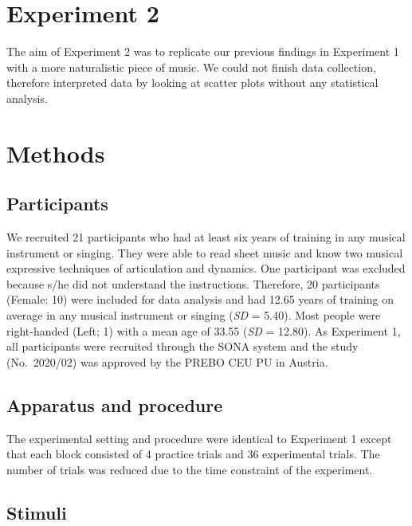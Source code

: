 \documentclass[
  man,floatsintext]{apa6}
\begin{document}
\clearpage

\hypertarget{experiment-2}{%
\section{Experiment 2}\label{experiment-2}}

The aim of Experiment 2 was to replicate our previous findings in Experiment 1 with a more naturalistic piece of music. We could not finish data collection, therefore interpreted data by looking at scatter plots without any statistical analysis.

\hypertarget{methods-1}{%
\section{Methods}\label{methods-1}}

\hypertarget{participants-1}{%
\subsection{Participants}\label{participants-1}}

We recruited 21 participants who had at least six years of training in any musical instrument or singing. They were able to read sheet music and know two musical expressive techniques of articulation and dynamics. One participant was excluded because s/he did not understand the instructions. Therefore, 20 participants (Female: 10) were included for data analysis and had 12.65 years of training on average in any musical instrument or singing (\emph{SD} = 5.40). Most people were right-handed (Left; 1) with a mean age of 33.55 (\emph{SD} = 12.80). As Experiment 1, all participants were recruited through the SONA system and the study (No.~2020/02) was approved by the PREBO CEU PU in Austria.

\hypertarget{apparatus-and-procedure}{%
\subsection{Apparatus and procedure}\label{apparatus-and-procedure}}

The experimental setting and procedure were identical to Experiment 1 except that each block consisted of 4 practice trials and 36 experimental trials. The number of trials was reduced due to the time constraint of the experiment.

\hypertarget{stimuli-1}{%
\subsection{Stimuli}\label{stimuli-1}}
\end{document}
